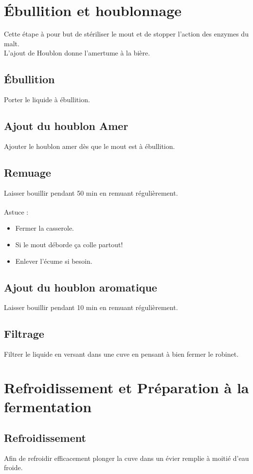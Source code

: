 \documentclass[twoside,twocolumn]{report}
\begin{document}
		\section{Ébullition et houblonnage}
			Cette étape à pour but de stériliser le mout et de stopper l'action des enzymes du malt.\\ L'ajout de Houblon donne l'amertume à la bière.
			\subsection{Ébullition}
				Porter le liquide à ébullition.
			\subsection{Ajout du houblon Amer }
				Ajouter le houblon amer dès que le mout est à ébullition.
			\subsection{Remuage}
				Laisser bouillir pendant 50 min en  remuant régulièrement.\\ \\
				
				Astuce : 
				\begin{itemize}
					\item Fermer la casserole.\\
					\item Si le mout déborde ça colle partout!\\
					\item Enlever l'écume si besoin.
				\end{itemize}
			\subsection{Ajout du houblon aromatique}
				Laisser bouillir pendant 10 min en  remuant régulièrement.
			\subsection{Filtrage}
				Filtrer le liquide en versant dans une cuve en pensant à bien fermer le robinet.\\
				
		\section{Refroidissement et Préparation à la fermentation}
			\subsection{Refroidissement}
				Afin de refroidir efficacement plonger la cuve dans un évier remplie à moitié d'eau froide.
\end{document}
